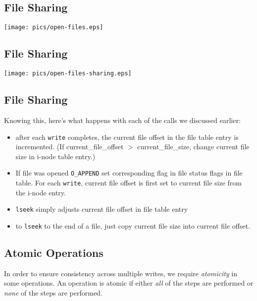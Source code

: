 \documentclass[xga]{xdvislides}
\begin{document}
\subsection{File Sharing}
\begin{center}
\texttt{[image: pics/open-files.eps]} \\
\end{center}

\subsection{File Sharing}
\begin{center}
\texttt{[image: pics/open-files-sharing.eps]} \\
\end{center}


\subsection{File Sharing}
Knowing this, here's what happens with each of the calls we discussed earlier:

\begin{itemize}
	\item after each {\tt write} completes, the current file offset in the
		file table entry is incremented.  (If current\_file\_offset $>$
		current\_file\_size, change current file size in i-node table entry.)
	\item If file was opened {\tt O\_APPEND} set corresponding flag in file status
		flags in file table. For each {\tt write}, current file offset is first set to
		current file size from the i-node entry.
	\item {\tt lseek} simply adjusts current file offset in file table entry
	\item to {\tt lseek} to the end of a file, just copy current file size into
		current file offset.
\end{itemize}

\subsection{Atomic Operations}

In order to ensure consistency across multiple writes,
we require {\em atomicity} in some operations.  An
operation is atomic if either {\em all} of the steps
are performed or {\em none} of the steps are
performed.  \\
\end{document}
